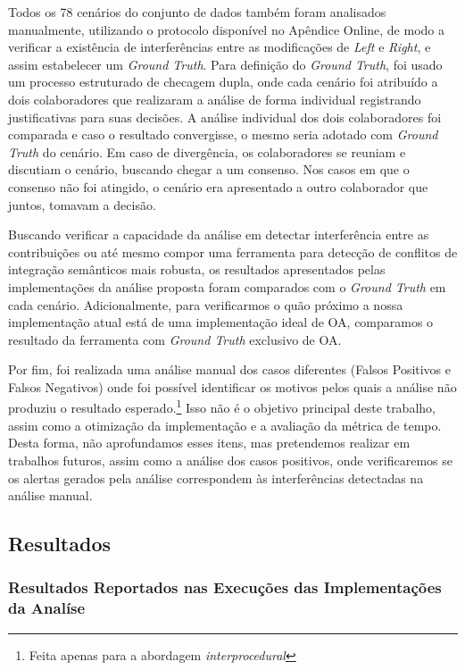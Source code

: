 Todos os 78 cenários do conjunto de dados também foram analisados manualmente, utilizando o protocolo disponível no Apêndice Online, de modo a verificar a existência de interferências entre as modificações de \emph{Left} e \emph{Right}, e assim estabelecer um \emph{Ground Truth}. Para definição do \emph{Ground Truth}, foi usado um processo estruturado de checagem dupla, onde cada cenário foi atribuído a dois colaboradores que realizaram a análise de forma individual registrando justificativas para suas decisões. A análise individual dos dois colaboradores foi comparada e caso o resultado convergisse, o mesmo seria adotado com \emph{Ground Truth} do cenário. Em caso de divergência, os colaboradores se reuniam e discutiam o cenário, buscando chegar a um consenso. Nos casos em que o consenso não foi atingido, o cenário era apresentado a outro colaborador que juntos, tomavam a decisão.

Buscando verificar a capacidade da análise em detectar interferência entre as contribuições ou até mesmo compor uma ferramenta para detecção de conflitos de integração semânticos mais robusta, os resultados apresentados pelas implementações da análise proposta foram comparados com o \emph{Ground Truth} em cada cenário. Adicionalmente, para verificarmos o quão próximo a nossa implementação atual está de uma implementação ideal de OA, comparamos o resultado da ferramenta com \emph{Ground Truth} exclusivo de OA. 

Por fim, foi realizada uma análise manual dos casos diferentes (Falsos Positivos e Falsos Negativos) onde foi possível identificar os motivos pelos quais a análise não produziu o resultado esperado.\footnote{Feita apenas para a abordagem \emph{interprocedural}} Isso não é o objetivo principal deste trabalho, assim como a otimização da implementação e a avaliação da métrica de tempo. Desta forma, não aprofundamos esses itens, mas pretendemos realizar em trabalhos futuros, assim como a análise dos casos positivos, onde verificaremos se os alertas gerados pela análise correspondem às interferências detectadas na análise manual.

\subsection{Resultados}

\subsubsection{Resultados Reportados nas Execuções das Implementações da Analíse}

